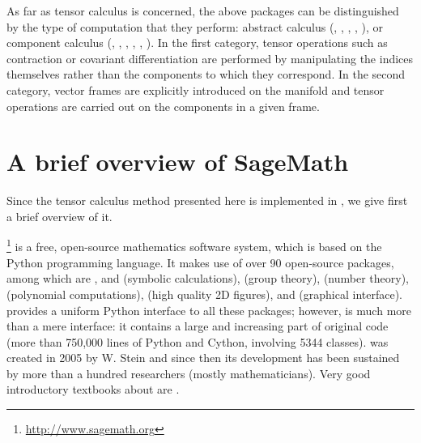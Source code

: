 As far as tensor calculus is concerned, the above packages can be distinguished by
the type of computation that they perform:
abstract calculus (, , ,
, ),
or component calculus (, , ,
, , ).
In the first category, tensor operations such as contraction or covariant differentiation
are performed by manipulating the indices themselves rather than the components
to which they correspond. In the second category, vector frames are explicitly
introduced on the manifold and tensor operations are carried out on the components
in a given frame.



\section{A brief overview of SageMath} \label{s:int:overview_Sage}

Since the tensor calculus method presented here is implemented in \Sage{}, we
give first a brief overview of it.

\Sage{}\footnote{\url{http://www.sagemath.org}} is a free, open-source mathematics software system, which is
based on the Python programming language. It makes use of over 90 open-source packages,
among which are ,  and  (symbolic calculations),
 (group theory),
 (number theory),  (polynomial computations),
 (high quality 2D figures), and  (graphical interface).
\Sage{} provides a uniform Python interface to all these packages; however,
\Sage{} is much more than a mere interface: it contains a large and increasing part of
original code (more than 750,000 lines of Python and Cython, involving 5344 classes).
\Sage{} was created in 2005 by W. Stein \cite{SteinJ05} and since
then its development has been sustained by more than a hundred researchers
(mostly mathematicians). Very good introductory textbooks about \Sage{} are
\cite{JoyneS14,Zimme13,Zimme18,Bard15}.

